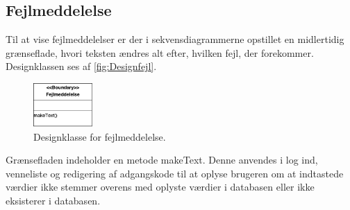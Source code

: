\subsection*{Fejlmeddelelse}
Til at vise fejlmeddelelser er der i sekvensdiagrammerne opstillet en midlertidig grænseflade, hvori teksten ændres alt efter, hvilken fejl, der forekommer. Designklassen ses af \autoref{fig:Designfejl}.

\begin{figure} [H]
\centering
\includegraphics[width=0.2\textwidth]{figures/MVC/MVCfejl}
\caption{Designklasse for fejlmeddelelse.}
\label{fig:Designfejl}
\end{figure}

\noindent
Grænsefladen indeholder en metode makeText. Denne anvendes i log ind, venneliste og redigering af adgangskode til at oplyse brugeren om at indtastede værdier ikke stemmer overens med oplyste værdier i databasen eller ikke eksisterer i databasen. 